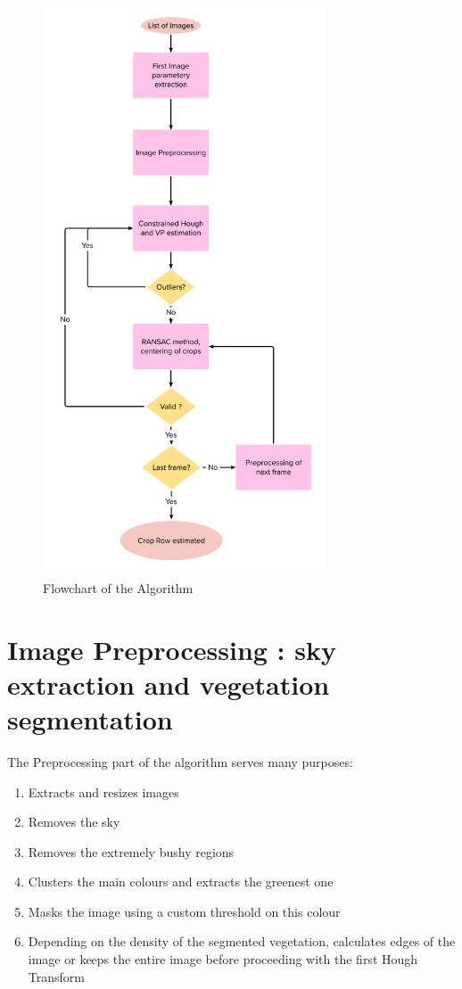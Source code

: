 \begin{figure}
   \centering
   \includegraphics[width=0.75\textwidth]{Report/images/FlowCharts/Algo14_01_2023-01-16_13-58-50.png}
   \caption{Flowchart of the Algorithm}
   \label{pics:AlgoFlowChart}
\end{figure}

\section{Image Preprocessing : sky extraction and vegetation segmentation}
\label{sec:gliederung}

The Preprocessing part of the algorithm serves many purposes:
\begin{enumerate}
    \item Extracts and resizes images
    \item Removes the sky
    \item Removes the extremely bushy regions
    \item Clusters the main colours and extracts the greenest one
    \item Masks the image using a custom threshold on this colour 
    \item Depending on the density of the segmented vegetation, calculates edges of the image or keeps the entire image before proceeding with the first Hough Transform
    \end{enumerate}

